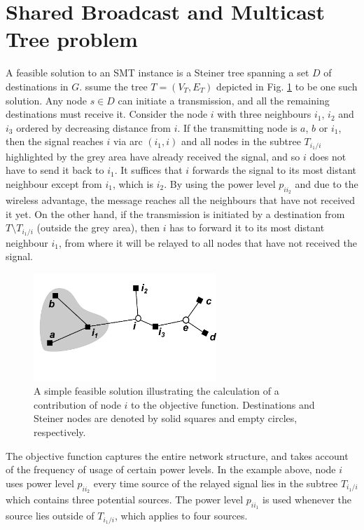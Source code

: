 \section{Shared Broadcast and Multicast Tree problem}
\label{sec:SBT}

A feasible solution to an SMT instance is a Steiner tree spanning a set $D$ of destinations in $G$.
ssume the tree $T=(V_T, E_T)$ depicted in Fig. \ref{fig:objexp} to be one such solution.
Any node $s\in D$ can initiate a transmission, and all the remaining destinations must receive it.
Consider the node $i$ with three neighbours $i_1$, $i_2$ and $i_3$ ordered by decreasing distance from $i$.
If the transmitting node is $a$, $b$ or $i_1$, then the signal reaches $i$ via arc $(i_1,i)$ and all nodes in the subtree $T_{i_1/i}$ highlighted by the grey area have already received the signal, and so $i$ does not have to send it back to $i_1$.
It suffices that $i$ forwards the signal to its most distant neighbour except from $i_1$, which is $i_2$.
By using the power level $p_{ii_2}$ and due to the wireless advantage, the message reaches all the neighbours that have not received it yet.
On the other hand, if the transmission is initiated by a destination from $T\setminus T_{i_1/i}$ (outside the grey area), then $i$ has to forward it to its most distant neighbour $i_1$, from where it will be relayed to all nodes that have not received the signal.
%
\begin{figure}[h!]
	\centering
	\includegraphics[height=1.6in]{objexp}
	\caption{A simple feasible solution illustrating the calculation of a contribution of node $i$ to the objective function.
		 Destinations and Steiner nodes are denoted by solid squares and empty circles, respectively.}
	\label{fig:objexp}
\end{figure}
%
The objective function captures the entire network structure, and takes account of the  frequency of usage of certain power levels.
In the example above, node $i$ uses power level $p_{ii_2}$ every time source of the relayed signal lies in the subtree $T_{i_1/i}$ which contains three potential sources.
The power level $p_{ii_1}$ is used  whenever the source lies outside of $T_{i_1/i}$, which applies to four sources.
